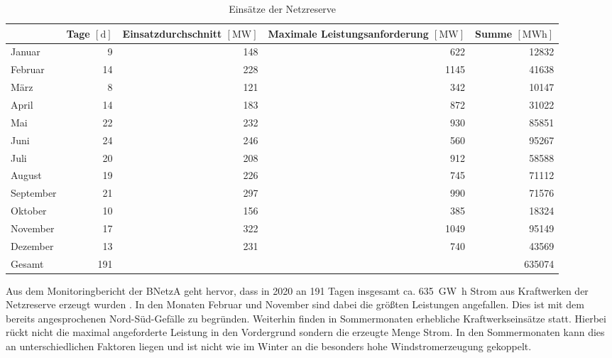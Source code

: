 			\begin{table}[H]
				\centering
				\caption{Einsätze der Netzreserve \cite{Monitoringbericht_BNetzA}}
				\label{Tab. Einsätze Netzreserve}
				\begin{tabular}{lrrrr}
					\hline
					& \makecell[c]{Tage \\ $\left[\si{\day}\right]$} & \makecell[c]{Einsatzdurchschnitt \\ $\left[\si{\mega\watt}\right]$} & \makecell[c]{Maximale Leistungsanforderung \\ $\left[\si{\mega\watt}\right]$} & \makecell[c]{Summe \\ $\left[\si{\mega\watt\hour}\right]$} \\ \hline
					Januar & \num{9} & \num{148} & \num{622} & \num{12832} \\
					Februar & \num{14} & \num{228} & \num{1145} & \num{41638} \\
					März & \num{8} & \num{121} & \num{342} & \num{10147} \\
					April & \num{14} & \num{183} & \num{872} & \num{31022} \\
					Mai & \num{22} & \num{232} & \num{930} & \num{85851} \\
					Juni & \num{24} & \num{246} & \num{560} & \num{95267} \\
					Juli & \num{20} & \num{208} & \num{912} & \num{58588} \\
					August & \num{19} & \num{226} & \num{745} & \num{71112} \\
					September & \num{21} & \num{297} & \num{990} & \num{71576} \\
					Oktober & \num{10} & \num{156} & \num{385} & \num{18324} \\
					November & \num{17} & \num{322} & \num{1049} & \num{95149} \\
					Dezember & \num{13} & \num{231} & \num{740} & \num{43569} \\ \hline
					Gesamt & \num{191} &  &  & \num{635074} \\ \hline
				\end{tabular}
			\end{table}
			
			Aus dem Monitoringbericht der BNetzA geht hervor, dass in 2020 an \num{191} Tagen insgesamt ca. \SI{635}{\giga\watt\hour} Strom aus Kraftwerken der Netzreserve erzeugt wurden \cite{Monitoringbericht_BNetzA}.
			In den Monaten Februar und November sind dabei die größten Leistungen angefallen.
			Dies ist mit dem bereits angesprochenen Nord-Süd-Gefälle zu begründen.	
			Weiterhin finden in Sommermonaten erhebliche Kraftwerkseinsätze statt.
			Hierbei rückt nicht die maximal angeforderte Leistung in den Vordergrund sondern die erzeugte Menge Strom.
			In den Sommermonaten kann dies an unterschiedlichen Faktoren liegen und ist nicht wie im Winter an die besonders hohe Windstromerzeugung gekoppelt.
		    
